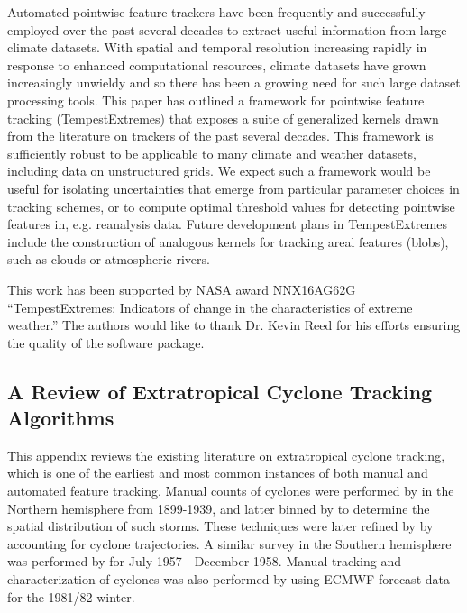 \documentclass[gmdd, hvmath, online]{copernicus_discussions}
\begin{document}
\conclusions \label{sec:Conclusions}

Automated pointwise feature trackers have been frequently and successfully employed over the past several decades to extract useful information from large climate datasets.  With spatial and temporal resolution increasing rapidly in response to enhanced computational resources, climate datasets have grown increasingly unwieldy and so there has been a growing need for such large dataset processing tools.  This paper has outlined a framework for pointwise feature tracking (TempestExtremes) that exposes a suite of generalized kernels drawn from the literature on trackers of the past several decades.  This framework is sufficiently robust to be applicable to many climate and weather datasets, including data on unstructured grids.  We expect such a framework would be useful for isolating uncertainties that emerge from particular parameter choices in tracking schemes, or to compute optimal threshold values for detecting pointwise features in, e.g. reanalysis data.  Future development plans in TempestExtremes include the construction of analogous kernels for tracking areal features (blobs), such as clouds or atmospheric rivers.


\pagebreak
\begin{acknowledgements}
This work has been supported by NASA award NNX16AG62G ``TempestExtremes: Indicators of change in the characteristics of extreme weather.''  The authors would like to thank Dr. Kevin Reed for his efforts ensuring the quality of the software package.
\end{acknowledgements}
\pagebreak


\appendix
\subsection{A Review of Extratropical Cyclone Tracking Algorithms} \label{sec:ExtratropicalCycloneAlgorithms}

This appendix reviews the existing literature on extratropical cyclone tracking, which is one of the earliest and most common instances of both manual and automated feature tracking.  Manual counts of cyclones were performed by \cite{petterssen1956weather} in the Northern hemisphere from 1899-1939, and latter binned by \cite{klein1957principle} to determine the spatial distribution of such storms.  These techniques were later refined by \cite{whittaker1982atlas} by accounting for cyclone trajectories.  A similar survey in the Southern hemisphere was performed by \cite{taljaard1967development} for July 1957 - December 1958.  Manual tracking and characterization of cyclones was also performed by \cite{akyildiz1985systematic} using ECMWF forecast data for the 1981/82 winter.
\end{document}
